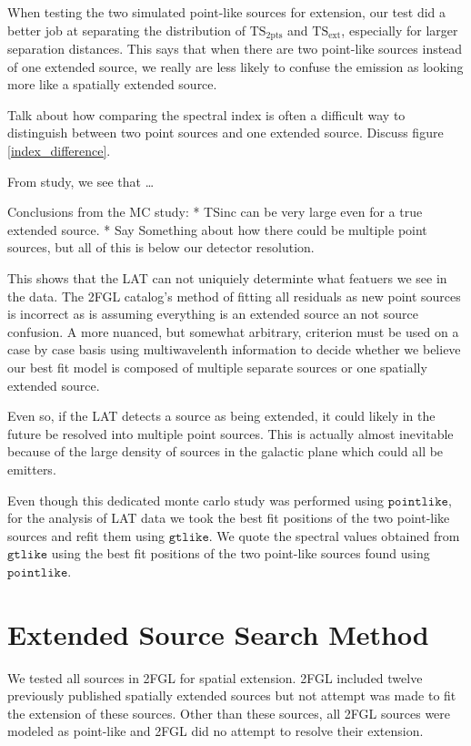 \documentclass[12pt,preprint]{aastex}
\newcommand{\gev}{\text{GeV}\xspace}
\newcommand{\tsext}{{\ensuremath{\text{TS}_{\text{ext}}}}\xspace}
\newcommand{\tsinc}{\ensuremath{\text{TS}_{\text{2pts}}}\xspace}
\newcommand{\gtlike}{\ensuremath{\mathtt{gtlike}}\xspace}
\newcommand{\pointlike}{\ensuremath{\mathtt{pointlike}}\xspace}
\begin{document}
{When testing the two simulated point-like sources for extension, our
test did a better job at separating the distribution of \tsinc and
\tsext, especially for larger separation distances.  This says that
when there are two point-like sources instead of one extended source,
we really are less likely to confuse the emission as looking more like
a spatially extended source. 





Talk about how comparing the spectral index is often a
difficult way to distinguish between two point sources
and one extended source. Discuss figure \ref{index_difference}.

From study, we see that \dots

Conclusions from the MC study:
* TSinc can be very large even for a true extended source.
* Say Something about how there could be multiple point sources,
  but all of this is below our detector resolution.

This shows that the LAT can not uniquiely determinte what featuers
we see in the data. The 2FGL catalog's method of fitting all residuals
as new point sources is incorrect as is assuming everything is an
extended source an not source confusion. A more nuanced, but somewhat arbitrary,
criterion must be used on a case by case basis using multiwavelenth
information to decide whether we believe our best fit model is 
composed of multiple separate sources or one spatially extended source.

Even so, if the LAT detects a source as being extended, it could
likely in the future be resolved into multiple point sources.
This is actually almost inevitable because of the large density of
sources in the galactic plane which could all be \gev emitters.

Even though this dedicated monte carlo study was performed
using \pointlike, for the analysis of LAT data we took the best
fit positions of the two point-like sources and refit them using \gtlike.
We quote the spectral values obtained from \gtlike using the best fit
positions of the two point-like sources found using \pointlike.  


}

\section{Extended Source Search Method}
\label{extended_source_search_method}

We tested all sources in 2FGL for spatial extension.
2FGL included
twelve previously published spatially extended sources but not
attempt was made to fit the extension of these sources. Other than these sources,
all 2FGL sources were modeled as point-like and 2FGL did no attempt
to resolve their extension.
\end{document}
